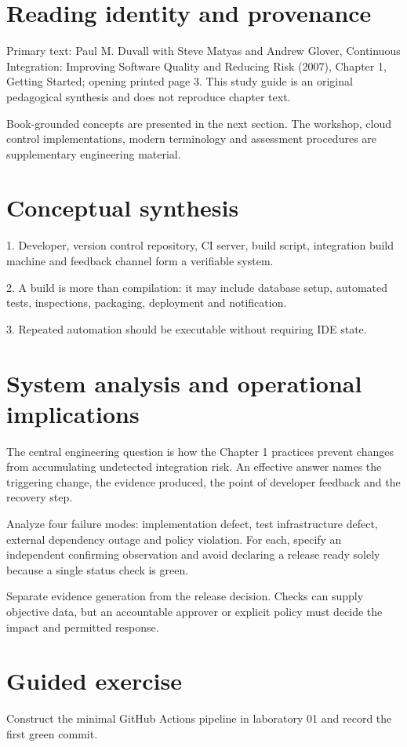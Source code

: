 \documentclass[11pt,letterpaper]{article}
\begin{document}
\makedoctitle
\makedocsummary
\tableofcontents
\clearpage
\section{Reading identity and provenance}
Primary text: Paul M. Duvall with Steve Matyas and Andrew Glover, Continuous Integration: Improving Software Quality and Reducing Risk (2007), Chapter 1, Getting Started; opening printed page 3. This study guide is an original pedagogical synthesis and does not reproduce chapter text.

Book-grounded concepts are presented in the next section. The workshop, cloud control implementations, modern terminology and assessment procedures are supplementary engineering material.

\section{Conceptual synthesis}
1. Developer, version control repository, CI server, build script, integration build machine and feedback channel form a verifiable system.

2. A build is more than compilation: it may include database setup, automated tests, inspections, packaging, deployment and notification.

3. Repeated automation should be executable without requiring IDE state.

\section{System analysis and operational implications}
The central engineering question is how the Chapter 1 practices prevent changes from accumulating undetected integration risk. An effective answer names the triggering change, the evidence produced, the point of developer feedback and the recovery step.

Analyze four failure modes: implementation defect, test infrastructure defect, external dependency outage and policy violation. For each, specify an independent confirming observation and avoid declaring a release ready solely because a single status check is green.

Separate evidence generation from the release decision. Checks can supply objective data, but an accountable approver or explicit policy must decide the impact and permitted response.

\section{Guided exercise}
Construct the minimal GitHub Actions pipeline in laboratory 01 and record the first green commit.
\end{document}
